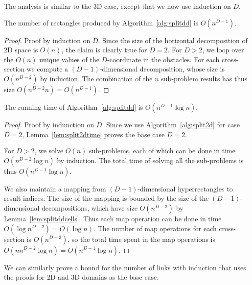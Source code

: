\documentclass[english,gradu]{tktltiki2018}
\begin{document}
The analysis is similar to the 3D case, except that we now use induction on $D$.

\begin{lem}\label{lem:splitddcells}The number of rectangles produced by Algorithm~\ref{alg:splitdd} is $O(n^{D-1})$.\end{lem}
\begin{proof}
Proof by induction on $D$.
Since the size of the horizontal decomposition of 2D space is $O(n)$, the claim is clearly true for $D=2$.
For $D>2$, we loop over the $O(n)$ unique values of the $D$-coordinate in the obstacles.
For each cross-section we compute a $(D-1)$-dimensional decomposition, whose size is $O(n^{D-2})$ by induction.
The combination of the $n$ sub-problem results has thus size $O(n^{D-2}n)=O(n^{D-1})$.
\end{proof}

\begin{lem}\label{lem:splitddtime}The running time of Algorithm~\ref{alg:splitdd} is $O(n^{D-1}\log n)$.\end{lem}
\begin{proof}
Proof by indunction on $D$.
Since we use Algorithm~\ref{alg:split2d} for case $D=2$, Lemma~\ref{lem:split2dtime} proves the base case $D=2$.

For $D>2$, we solve $O(n)$ sub-problems, each of which can be done in time $O(n^{D-2}\log n)$ by induction.
The total time of solving all the sub-problems is thus $O(n^{D-1}\log n)$.

We also maintain a mapping from $(D-1)$-dimensional hyperrectangles to result indices.
The size of the mapping is bounded by the size of the $(D-1)$-dimensional decompositions, which have size $O(n^{D-2})$ by Lemma~\ref{lem:splitddcells}.
Thus each map operation can be done in time $O(\log{n^{D-2}})=O(\log n)$.
The number of map operations for each cross-section is $O(n^{D-2})$, so the total time spent in the map operations is $O(nn^{D-2}\log n)=O(n^{D-1}\log n)$.
\end{proof}

We can similarly prove a bound for the number of links with induction that uses the proofs for 2D and 3D domains as the base case.
\end{document}
